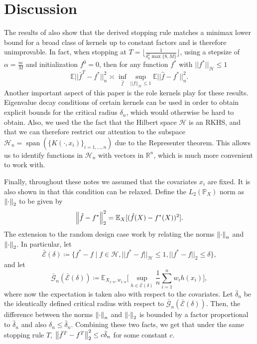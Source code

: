 \section{Discussion}
The results of \cite{wain17ada} also show that the derived stopping rule matches a minimax lower bound for a broad class of kernels up to constant factors and is therefore unimprovable. In fact, when stopping at $T=\lfloor \frac{1}{\delta_n^2 \max\{8,M\}}\rfloor$, using a stepsize of $\alpha=\frac{m}{M}$ and initialization $f^0=0$, then for any function $f^*$ with $||f^*||_{\mathcal{H}}\le 1$
\begin{equation}
\mathbb{E}||\bar{f}^T-f^*||_n^2 \asymp \inf_{\hat{f}}\sup_{||f||_{\mathcal{H}}\le 1} \mathbb{E}||\hat{f}-f^*||_n^2.
\end{equation}
Another important aspect of this paper is the role kernels play for these results.
Eigenvalue decay conditions of certain kernels can be used in order to obtain explicit bounds for the critical radius $\delta_n$, which would otherwise be hard to obtain.
Also, we used the the fact that the Hilbert space $\mathcal{H}$ is an RKHS, and that we can therefore restrict our attention to the subspace $\mathcal{H}_n = \operatorname{span}(\{K(\cdot, x_i)\}_{i=1,...,n})$ due to the Representer theorem. This allows us to identify functions in $\mathcal{H}_n$ with vectors in $\mathbb{R}^n$, which is much more convenient to work with.

Finally, throughout these notes we assumed that the covariates $x_{i}$ are fixed.
It is also shown in \citet{wain17ada} that this condition can be relaxed.
Define the $L_{2}(\mathbb{P}_{X})$ norm as $\left\lVert\cdot\right\rVert_{2}$ to be given by
$$
\left\lVert\hat{f} - f^{*}\right\rVert_{2}^{2} = \mathbb{E}_{X}[(\hat{f}(X) - f^{*}(X))^{2}].
$$
The extension to the random design case work by relating the norms
$\left\lVert\cdot\right\rVert_{n}$
and $\left\lVert\cdot\right\rVert_{2}$.
In particular, let
$$
\bar{\mathcal{E}}(\delta) \coloneqq \{f^{*}-f \mid f\in\mathcal{H}, ||f^{*}-f||_{\mathcal{H}}\le 1, ||f^{*}-f||_2 \leq \delta\},
$$
and let
\begin{equation}
\bar{\mathcal{G}}_{n}(\bar{\mathcal{E}}(\delta)) \coloneqq
\mathbb{E}_{X_{1:n}, w_{1:n}}\Big[\sup_{h\in\bar{\mathcal{E}}(\delta)}\frac{1}{n}\sum_{i=1}^nw_ih(x_i)\Big],
\end{equation}
where now the expectation is taken also with respect to the covariates.
Let $\bar{\delta}_{n}$ be the identically defined critical radius with respect to
$\bar{\mathcal{G}}_{n}(\bar{\mathcal{E}}(\delta))$.
Then, the difference between the norms
$\left\lVert\cdot\right\rVert_{n}$
and $\left\lVert\cdot\right\rVert_{2}$ is bounded by a factor proportional to $\bar{\delta}_{n}$
and also $\delta_{n} \leq \bar{\delta}_{n}$. Combining these two facts, we get that
under the same stopping rule $T$, $\left\lVert\bar{f}^{T} - f^{T}\right\rVert_{2}^{2} \leq c \bar{\delta}_{n}$
for some constant $c$.

